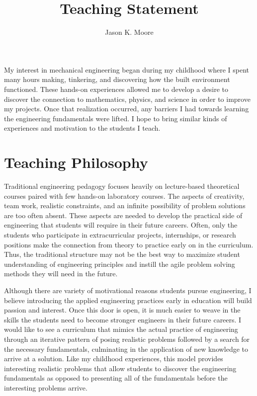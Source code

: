 \documentclass{article}
\title{Teaching Statement}
\author{Jason K. Moore}
\date{}
\begin{document}
\maketitle

My interest in mechanical engineering began during my childhood where I spent
many hours making, tinkering, and discovering how the built environment
functioned. These hands-on experiences allowed me to develop a desire to
discover the connection to mathematics, physics, and science in order to
improve my projects. Once that realization occurred, any barriers I had towards
learning the engineering fundamentals were lifted. I hope to bring similar
kinds of experiences and motivation to the students I teach.

\section*{Teaching Philosophy}
%
Traditional engineering pedagogy focuses heavily on lecture-based theoretical
courses paired with few hands-on laboratory courses. The aspects of creativity,
team work, realistic constraints, and an infinite possibility of problem
solutions are too often absent. These aspects are needed to develop the
practical side of engineering that students will require in their future
careers. Often, only the students who participate in extracurricular projects,
internships, or research positions make the connection from theory to practice
early on in the curriculum. Thus, the traditional structure may not be the best
way to maximize student understanding of engineering principles and instill the
agile problem solving methods they will need in the future.

Although there are variety of motivational reasons students pursue engineering,
I believe introducing the applied engineering practices early in education will
build passion and interest. Once this door is open, it is much easier to weave
in the skills the students need to become stronger engineers in their future
careers. I would like to see a curriculum that mimics the actual practice of
engineering through an iterative pattern of posing realistic problems followed
by a search for the necessary fundamentals, culminating in the application of
new knowledge to arrive at a solution. Like my childhood experiences, this
model provides interesting realistic problems that allow students to discover
the engineering fundamentals as opposed to presenting all of the fundamentals
before the interesting problems arrive.
\end{document}
